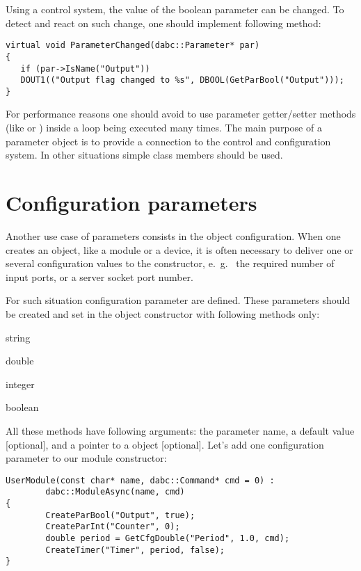 Using a control system, the value of the boolean parameter can be changed. 
To detect and react on such change,
one should implement following method: 
 
\begin{verbatim}
virtual void ParameterChanged(dabc::Parameter* par) 
{
   if (par->IsName("Output")) 
   DOUT1(("Output flag changed to %s", DBOOL(GetParBool("Output")));
}
\end{verbatim}

For performance reasons one should avoid to use parameter getter/setter methods 
(like   or ) inside a loop 
being executed many times. The main purpose of a parameter
object is to provide a connection to the control and configuration system.
In other situations simple class members should be used.


\section{Configuration parameters}
\label{prog_setup_configurationparameter}
Another use case of parameters consists in the object configuration.
When one creates an object, like a module or a device, 
it is often necessary to deliver one or several configuration values 
to the constructor, e.~g.~ the required
number of input ports, or a server socket port number. 

For such situation configuration parameter are defined.
These parameters should be created and set 
in the object constructor with following methods only:


\bdes
\item[GetCfgStr]  string
\item[GetCfgDouble]   double 
\item[GetCfgInt]   integer
\item[GetCfgBool]   boolean 
\edes

All these methods have following arguments: the parameter name, 
a default value [optional], and a pointer to a  object [optional].
Let's add one configuration parameter to our module constructor:

\begin{small}
\begin{verbatim}
UserModule(const char* name, dabc::Command* cmd = 0) : 
        dabc::ModuleAsync(name, cmd)
{
        CreateParBool("Output", true);
        CreateParInt("Counter", 0);
        double period = GetCfgDouble("Period", 1.0, cmd);
        CreateTimer("Timer", period, false);
}
\end{verbatim}
\end{small}

